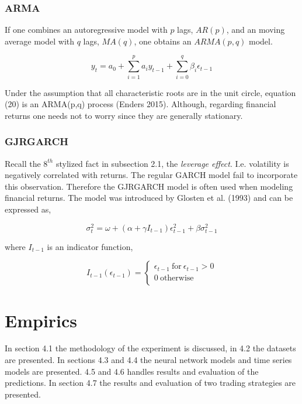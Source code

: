 \documentclass[12pt, letterpaper]{amsart}%
\begin{document}
\subsubsection{ARMA}
If one combines an autoregressive model with $p$ lags, $AR(p)$, and an moving average model with $q$ lags, $MA(q)$, one obtains an $ARMA(p,q)$ model.

\begin{equation}
y_t = a_0 + \sum_{i=1}^p a_i y_{t-1} + \sum_{i=0}^q \beta_i \epsilon_{t-1} 
\end{equation}

Under the assumption that all characteristic roots are in the unit circle, equation (20) is an ARMA(p,q) process (Enders 2015). Although, regarding financial returns one needs not to worry since they are generally stationary.

\subsubsection{GJRGARCH}
Recall the $8^{th}$ stylized fact in subsection 2.1, the \textit{leverage effect}. I.e. volatility is negatively correlated with returns. The regular GARCH model fail to incorporate this observation. Therefore the GJRGARCH model is often used when modeling financial returns. The model was introduced by Glosten et al. (1993) and can be expressed as,

\begin{equation}
\sigma_t^2 = \omega + (\alpha + \gamma I_{t-1}) \epsilon_{t-1}^2 + \beta \sigma^2_{t-1}
\end{equation}

where $I_{t-1}$ is an indicator function,

\begin{equation}
I_{t-1}(\epsilon_{t-1}) = 
     \begin{cases}
       \epsilon_{t-1} \ \text{for} \ \epsilon_{t-1} > 0 \\
       0 \ \text{otherwise} \\ 
     \end{cases}
\end{equation}


\section{Empirics}
In section 4.1 the methodology of the experiment is discussed, in 4.2 the datasets are presented. In sections 4.3 and 4.4 the neural network models and time series models are presented. 4.5 and 4.6 handles results and evaluation of the predictions. In section 4.7 the results and evaluation of two trading strategies are presented.
\end{document}
